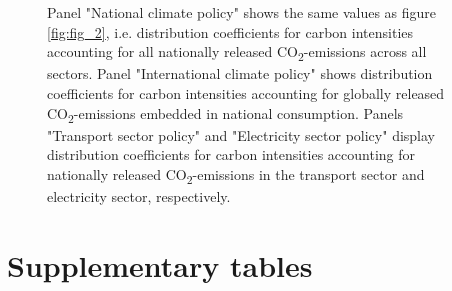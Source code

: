 \documentclass[12pt, a4paper]{article}
\newenvironment{subcaption2}
{\strut
\vspace{-5pt}
\begin{minipage}[b]{0.9\textwidth}
  \hspace*{-\parindent}
  \footnotesize}
 {\end{minipage}}
\begin{document}
\begin{refsection}
\begin{figure}[ht!]
\begin{subcaption2}
    Panel "National climate policy" shows the same values as figure \ref{fig:fig_2}, i.e. distribution coefficients for carbon intensities accounting for all nationally released CO\textsubscript{2}-emissions across all sectors. Panel "International climate policy" shows distribution coefficients for carbon intensities accounting for globally released CO\textsubscript{2}-emissions embedded in national consumption. Panels "Transport sector policy" and "Electricity sector policy" display distribution coefficients for carbon intensities accounting for nationally released CO\textsubscript{2}-emissions in the transport sector and electricity sector, respectively.
    \end{subcaption2}
\end{figure}


\clearpage

\section{Supplementary tables} \label{sec:tables}


\clearpage


\clearpage


\clearpage


\clearpage


\clearpage


\clearpage

%   



\clearpage


\clearpage


\clearpage


\end{refsection}
\end{document}
